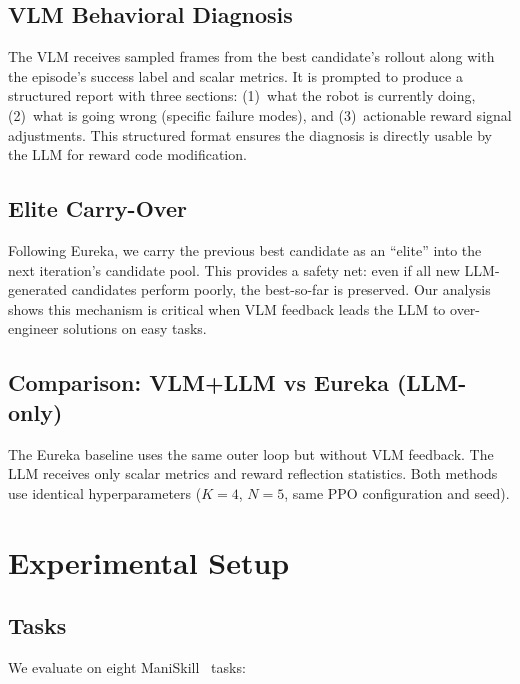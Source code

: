 \documentclass[conference]{IEEEtran}
\begin{document}
\subsection{VLM Behavioral Diagnosis}

The VLM receives sampled frames from the best candidate's rollout along with
the episode's success label and scalar metrics. It is prompted to produce a
structured report with three sections: (1)~what the robot is currently doing,
(2)~what is going wrong (specific failure modes), and (3)~actionable reward
signal adjustments. This structured format ensures the diagnosis is directly
usable by the LLM for reward code modification.

\subsection{Elite Carry-Over}

Following Eureka, we carry the previous best candidate as an ``elite'' into the
next iteration's candidate pool. This provides a safety net: even if all new
LLM-generated candidates perform poorly, the best-so-far is preserved. Our
analysis shows this mechanism is critical when VLM feedback leads the LLM to
over-engineer solutions on easy tasks.

\subsection{Comparison: VLM+LLM vs Eureka (LLM-only)}

The Eureka baseline uses the same outer loop but without VLM feedback. The LLM
receives only scalar metrics and reward reflection statistics. Both methods use
identical hyperparameters ($K=4$, $N=5$, same PPO configuration and seed).


\section{Experimental Setup}

\subsection{Tasks}

We evaluate on eight ManiSkill~\cite{gu2023maniskill2} tasks:
\end{document}

